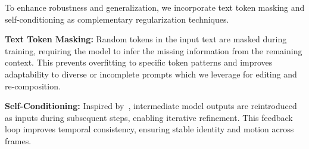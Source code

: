 To enhance robustness and generalization, we incorporate text token masking and self-conditioning as complementary regularization techniques.

\textbf{Text Token Masking:} Random tokens in the input text are masked during training, requiring the model to infer the missing information from the remaining context. This prevents overfitting to specific token patterns and improves adaptability to diverse or incomplete prompts which we leverage for editing and re-composition.

\textbf{Self-Conditioning:} Inspired by~\cite{chen2023fit}, intermediate model outputs are reintroduced as inputs during subsequent steps, enabling iterative refinement. This feedback loop improves temporal consistency, ensuring stable identity and motion across frames.

